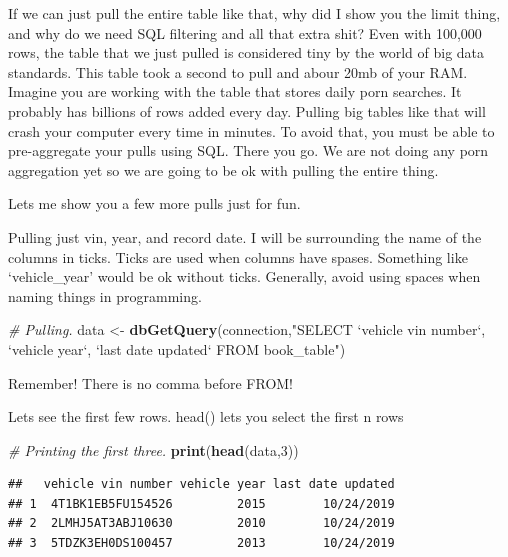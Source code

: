 \documentclass[]{book}
\newenvironment{Shaded}{\begin{snugshade}}{\end{snugshade}}
\newcommand{\CommentTok}[1]{\textcolor[rgb]{0.56,0.35,0.01}{\textit{#1}}}
\newcommand{\DecValTok}[1]{\textcolor[rgb]{0.00,0.00,0.81}{#1}}
\newcommand{\KeywordTok}[1]{\textcolor[rgb]{0.13,0.29,0.53}{\textbf{#1}}}
\newcommand{\NormalTok}[1]{#1}
\newcommand{\StringTok}[1]{\textcolor[rgb]{0.31,0.60,0.02}{#1}}
\begin{document}
If we can just pull the entire table like that, why did I show you the limit thing, and why do we need SQL filtering and all that extra shit? Even with 100,000 rows, the table that we just pulled is considered tiny by the world of big data standards. This table took a second to pull and abour 20mb of your RAM. Imagine you are working with the table that stores daily porn searches. It probably has billions of rows added every day. Pulling big tables like that will crash your computer every time in minutes. To avoid that, you must be able to pre-aggregate your pulls using SQL. There you go. We are not doing any porn aggregation yet so we are going to be ok with pulling the entire thing.

Lets me show you a few more pulls just for fun.

Pulling just vin, year, and record date. I will be surrounding the name of the columns in ticks. Ticks are used when columns have spases. Something like `vehicle\_year' would be ok without ticks. Generally, avoid using spaces when naming things in programming.

\begin{Shaded}
\begin{Highlighting}[]
\CommentTok{# Pulling.}
\NormalTok{data <-}\StringTok{ }\KeywordTok{dbGetQuery}\NormalTok{(connection,}\StringTok{"SELECT }
\StringTok{                   `vehicle vin number`,}
\StringTok{                   `vehicle year`,}
\StringTok{                   `last date updated` }
\StringTok{                   FROM book_table"}\NormalTok{)}
\end{Highlighting}
\end{Shaded}

Remember! There is no comma before FROM!

Lets see the first few rows. head() lets you select the first n rows

\begin{Shaded}
\begin{Highlighting}[]
\CommentTok{# Printing the first three.}
\KeywordTok{print}\NormalTok{(}\KeywordTok{head}\NormalTok{(data,}\DecValTok{3}\NormalTok{)) }
\end{Highlighting}
\end{Shaded}

\begin{verbatim}
##   vehicle vin number vehicle year last date updated
## 1  4T1BK1EB5FU154526         2015        10/24/2019
## 2  2LMHJ5AT3ABJ10630         2010        10/24/2019
## 3  5TDZK3EH0DS100457         2013        10/24/2019
\end{verbatim}
\end{document}

